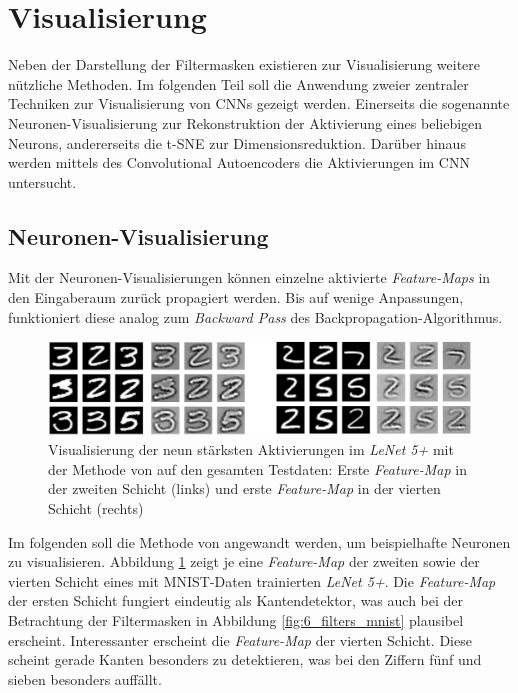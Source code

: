 	
\section{Visualisierung}
Neben der Darstellung der Filtermasken existieren zur Visualisierung weitere nützliche Methoden.
Im folgenden Teil soll die Anwendung zweier zentraler Techniken zur Visualisierung von CNNs gezeigt werden. Einerseits die sogenannte Neuronen-Visualisierung zur Rekonstruktion der Aktivierung eines beliebigen Neurons, andererseits die t-SNE zur Dimensionsreduktion. Darüber hinaus werden mittels des Convolutional Autoencoders die Aktivierungen im CNN untersucht.
	

\subsection{Neuronen-Visualisierung}
Mit der Neuronen-Visualisierungen können einzelne aktivierte \textit{Feature-Maps} in den Eingaberaum zurück propagiert werden. Bis auf wenige Anpassungen, funktioniert diese analog zum \textit{Backward Pass} des Backpropagation-Algorithmus.


\begin{figure}
\centering
\includegraphics[width=1.0\linewidth]{images/6_visualize_mnist}
\caption[]{Visualisierung der neun stärksten Aktivierungen im \textit{LeNet 5+} mit der Methode von \cite{Zeiler2014} auf den gesamten Testdaten:  Erste \textit{Feature-Map} in der zweiten Schicht (links) und erste \textit{Feature-Map} in der vierten Schicht (rechts)}
\label{fig:6_vis_mnist}
\end{figure}


Im folgenden soll die Methode von \cite{Zeiler2014} angewandt werden, um beispielhafte Neuronen zu visualisieren. Abbildung \ref{fig:6_vis_mnist} zeigt je eine \textit{Feature-Map} der zweiten sowie der vierten Schicht eines mit MNIST-Daten trainierten \textit{LeNet 5+}. Die \textit{Feature-Map} der ersten Schicht fungiert eindeutig als Kantendetektor, was auch bei der Betrachtung der Filtermasken in Abbildung \ref{fig:6_filters_mnist} plausibel erscheint. Interessanter erscheint die \textit{Feature-Map} der vierten Schicht. Diese scheint gerade Kanten besonders zu detektieren, was bei den Ziffern fünf und sieben besonders auffällt.



